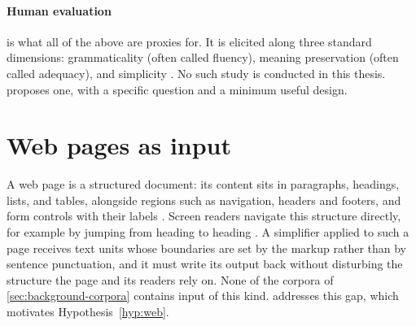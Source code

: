 \paragraph{Human evaluation} is what all of the above are proxies for.
It is elicited along three standard dimensions: grammaticality (often called fluency), meaning preservation (often called adequacy), and simplicity \parencite[147]{alva-manchego-etal-2020-survey}.
No such study is conducted in this thesis.
 proposes one, with a specific question and a minimum useful design.

\section{Web pages as input}
\label{sec:background-web}

A web page is a structured document: its content sits in paragraphs, headings, lists, and tables, alongside regions such as navigation, headers and footers, and form controls with their labels \parencite[518--519]{hellbusch2018webdesign}.
Screen readers navigate this structure directly, for example by jumping from heading to heading \parencite[519]{hellbusch2018webdesign}.
A simplifier applied to such a page receives text units whose boundaries are set by the markup rather than by sentence punctuation, and it must write its output back without disturbing the structure the page and its readers rely on.
None of the corpora of \cref{sec:background-corpora} contains input of this kind.
 addresses this gap, which motivates Hypothesis~\cref{hyp:web}.
